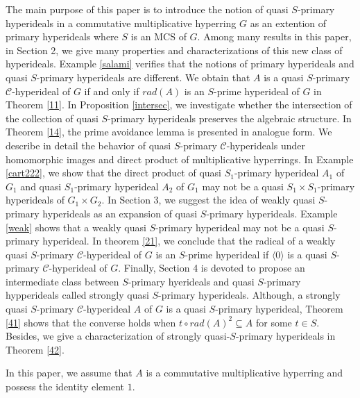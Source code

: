 \documentclass[preprint,review,10pt]{amsart}
\theoremstyle{definition}
\theoremstyle{remark}
\numberwithin{equation}{section}
\begin{document}
The main purpose of this paper is to introduce the notion of quasi $S$-primary hyperideals in a commutative multiplicative hyperring $G$ as an extention of primary hyperideals where $S$ is an MCS of $G$.  Among many results in this paper, in Section 2, we give many properties and characterizations of this new class of hyperideals. Example \ref{salami} verifies that the notions of  primary hyperideals and quasi $S$-primary hyperideals are different. We obtain that  $A$ is a quasi $S$-primary $\mathcal{C}$-hyperideal of $G$ if and only if $rad(A)$ is an  $S$-prime hyperideal of $G$ in Theorem \ref{11}. In Proposition \ref{intersec}, we investigate whether the intersection  of the collection of quasi $S$-primary hyperideals preserves the algebraic structure. In Theorem \ref{14}, the prime avoidance lemma is presented in analogue form. We describe in detail the behavior of quasi $S$-primary $\mathcal{C}$-hyperideals under homomorphic images and direct product of multiplicative hyperrings. In Example \ref{cart222}, we show that the direct product of  quasi $S_1$-primary hyperideal $A_1$ of $G_1$ and  quasi $S_1$-primary hyperideal $A_2$ of $G_1$ may not be a quasi $S_1 \times S_1$-primary hyperideals of $G_1 \times G_2$. In Section 3, we suggest the idea of weakly quasi $S$-primary hyperideals as an expansion of quasi $S$-primary hyperideals. Example \ref{weak}  shows that a weakly quasi $S$-primary hyperideal may not be a quasi $S$-primary hyperideal. In theorem \ref{21}, we conclude that the radical of a weakly quasi $S$-primary $\mathcal{C}$-hyperideal of $G$ is an $S$-prime hyperideal if $\langle 0 \rangle$ is a quasi $S$-primary $\mathcal{C}$-hyperideal of $G$. Finally, Section 4 is devoted to propose an intermediate class between  $S$-primary hyerideals and quasi $S$-primary hypperideals called strongly quasi $S$-primary hyperideals.   Although, a strongly quasi $S$-primary $\mathcal{C}$-hyperideal $A$ of $G$  is a quasi $S$-primary hyperideal, Theorem \ref{41} shows that the converse holds when $t \circ rad(A)^2 \subseteq A$ for some $t \in S$.  Besides, we give a characterization of strongly quasi-$S$-primary hyperideals in Theorem \ref{42}.

In this paper, we assume that  $A$  is  a commutative multiplicative hyperring and possess the identity element $1$.
\end{document}
